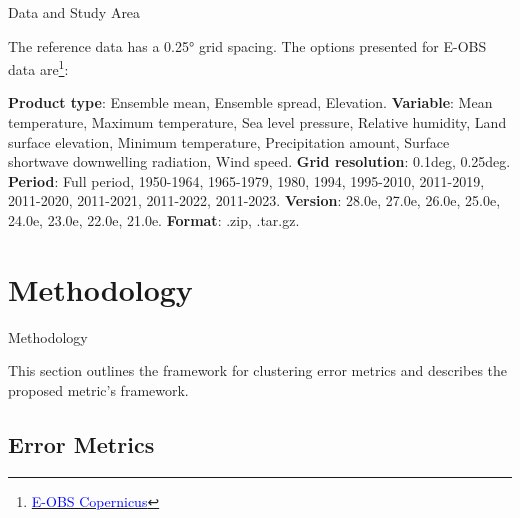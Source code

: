\documentclass[xcolor={dvipsnames}]{beamer}
\begin{document}
\begin{frame}{Data and Study Area}

The reference data has a 0.25° grid spacing. The options presented for E-OBS data are\footnote{\href{https://cds.climate.copernicus.eu/cdsapp#!/dataset/insitu-gridded-observations-europe?tab=form}{\textcolor{blue}{E-OBS Copernicus}}}:

\hfill

\textbf{Product type}: Ensemble mean, Ensemble spread, Elevation. \newline
\textbf{Variable}: Mean temperature, Maximum temperature, Sea level pressure, Relative humidity, Land surface elevation, Minimum temperature, Precipitation amount, Surface shortwave downwelling radiation, Wind speed. \newline
\textbf{Grid resolution}: 0.1deg, 0.25deg. \newline
\textbf{Period}: Full period, 1950-1964, 1965-1979, 1980, 1994, 1995-2010, 2011-2019, 2011-2020, 2011-2021, 2011-2022, 2011-2023. \newline
\textbf{Version}: 28.0e, 27.0e, 26.0e, 25.0e, 24.0e, 23.0e, 22.0e, 21.0e. \newline
\textbf{Format}: .zip, .tar.gz.
 
\end{frame}

\section{Methodology}

\begin{frame}{Methodology}

This section outlines the framework for clustering error metrics and describes the proposed metric's framework.
    
\end{frame}

\subsection{Error Metrics}
\end{document}

